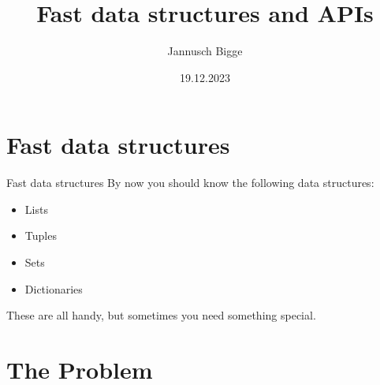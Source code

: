 \documentclass{beamer}
\title{Fast data structures and APIs}
\author{Jannusch Bigge}
\date{19.12.2023}
\begin{document}
\begin{frame}
    \titlepage
\end{frame}

\section{Fast data structures}

\begin{frame}{Fast data structures}
    By now you should know the following data structures:
    \begin{itemize}
        \item Lists
        \item Tuples
        \item Sets
        \item Dictionaries
    \end{itemize}
    \pause
    These are all handy, but sometimes you need something special.
\end{frame}

\section{The Problem}
\end{document}
